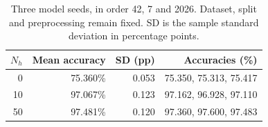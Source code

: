 \begin{table}[htbp]
\centering\small
\begin{tabular}{rrrr}
\toprule
$N_h$ & Mean accuracy & SD (pp) & Accuracies (\%) \\
\midrule
0 & 75.360\% & 0.053 & 75.350, 75.313, 75.417 \\
10 & 97.067\% & 0.123 & 97.162, 96.928, 97.110 \\
50 & 97.481\% & 0.120 & 97.360, 97.600, 97.483 \\
\bottomrule
\end{tabular}
\caption{Three model seeds, in order 42, 7 and 2026. Dataset, split and preprocessing remain fixed. SD is the sample standard deviation in percentage points.}
\label{tab:seed-results}
\end{table}
